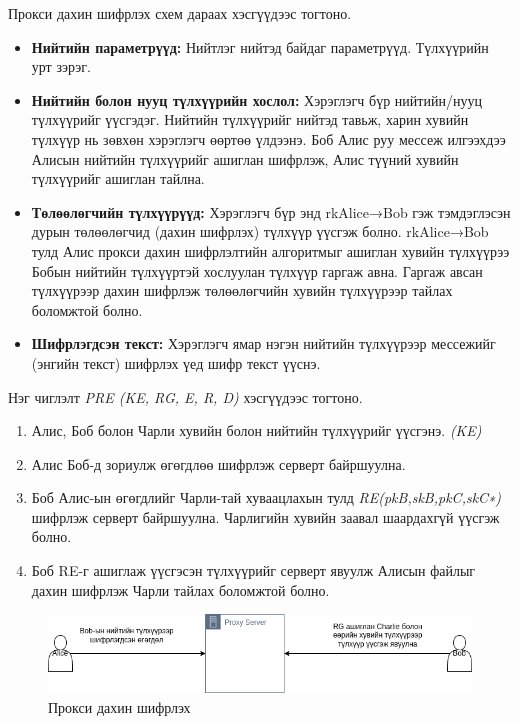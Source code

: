 Прокси дахин шифрлэх схем дараах хэсгүүдээс тогтоно.
\begin{itemize}
    \item \textbf{Нийтийн параметрүүд:} Нийтлэг нийтэд байдаг параметрүүд. Түлхүүрийн урт зэрэг.

    \item \textbf{Нийтийн болон нууц түлхүүрийн хослол:} Хэрэглэгч бүр нийтийн/нууц түлхүүрийг үүсгэдэг. Нийтийн түлхүүрийг нийтэд тавьж, харин хувийн түлхүүр нь зөвхөн хэрэглэгч өөртөө үлдээнэ. Боб Алис руу мессеж илгээхдээ Алисын нийтийн түлхүүрийг ашиглан шифрлэж, Алис түүний хувийн түлхүүрийг ашиглан тайлна.
    
    \item \textbf{Төлөөлөгчийн түлхүүрүүд:} Хэрэглэгч бүр энд rkAlice→Bob гэж тэмдэглэсэн дурын төлөөлөгчид (дахин шифрлэх) түлхүүр үүсгэж болно. rkAlice→Bob тулд Алис прокси дахин шифрлэлтийн алгоритмыг ашиглан хувийн түлхүүрээ Бобын нийтийн түлхүүртэй хослуулан түлхүүр гаргаж авна. Гаргаж авсан түлхүүрээр дахин шифрлэж төлөөлөгчийн хувийн түлхүүрээр тайлах боломжтой болно.
    
    \item \textbf{Шифрлэгдсэн текст:} Хэрэглэгч ямар нэгэн нийтийн түлхүүрээр мессежийг (энгийн текст) шифрлэх үед шифр текст үүснэ.
\end{itemize}

Нэг чиглэлт \emph{PRE (KE, RG, E, R, D)} хэсгүүдээс тогтоно.
\begin{enumerate}
    \item Алис, Боб болон Чарли хувийн болон нийтийн түлхүүрийг үүсгэнэ. \emph{(KE)}
    \item Алис Боб-д зориулж өгөгдлөө шифрлэж серверт байршуулна.
    \item Боб Алис-ын өгөгдлийг Чарли-тай хуваацлахын тулд \emph{RE(pkB,skB,pkC,skC∗)} шифрлэж серверт байршуулна. Чарлигийн хувийн заавал шаардахгүй үүсгэж болно.
    \item Боб RE-г ашиглаж үүсгэсэн түлхүүрийг серверт явуулж Алисын файлыг дахин шифрлэж Чарли тайлах боломжтой болно.
\end{enumerate}

\begin{figure}[ht]
    \centering
    \includegraphics[scale=0.5]{Figures/PRE.drawio.png}
    \caption[Proxy Re-encryption scheme]{Прокси дахин шифрлэх}
    \label{fig:PRE_Scheme}
\end{figure}

